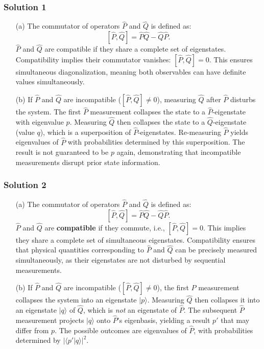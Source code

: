 \documentclass{article}
\begin{document}
\subsubsection{Solution 1}
\begin{enumerate}
    \item[(a)] The commutator of operators $\hat{P}$ and $\hat{Q}$ is defined as:
    \[
    [\hat{P}, \hat{Q}] = \hat{P}\hat{Q} - \hat{Q}\hat{P}.
    \]
    $\hat{P}$ and $\hat{Q}$ are compatible if they share a complete set of eigenstates. Compatibility implies their commutator vanishes: $[\hat{P}, \hat{Q}] = 0$. This ensures simultaneous diagonalization, meaning both observables can have definite values simultaneously.

    \item[(b)] If $\hat{P}$ and $\hat{Q}$ are incompatible ($[\hat{P}, \hat{Q}] \neq 0$), measuring $\hat{Q}$ after $\hat{P}$ disturbs the system. The first $\hat{P}$ measurement collapses the state to a $\hat{P}$-eigenstate with eigenvalue $p$. Measuring $\hat{Q}$ then collapses the state to a $\hat{Q}$-eigenstate (value $q$), which is a superposition of $\hat{P}$-eigenstates. Re-measuring $\hat{P}$ yields eigenvalues of $\hat{P}$ with probabilities determined by this superposition. The result is not guaranteed to be $p$ again, demonstrating that incompatible measurements disrupt prior state information.
\end{enumerate}

\subsubsection{Solution 2}
\begin{enumerate}
    \item[(a)] The commutator of operators $\hat{P}$ and $\hat{Q}$ is defined as:
    \[
    [\hat{P}, \hat{Q}] = \hat{P}\hat{Q} - \hat{Q}\hat{P}.
    \]
    $\hat{P}$ and $\hat{Q}$ are \textbf{compatible} if they commute, i.e., $[\hat{P}, \hat{Q}] = 0$. This implies they share a complete set of simultaneous eigenstates. Compatibility ensures that physical quantities corresponding to $\hat{P}$ and $\hat{Q}$ can be precisely measured simultaneously, as their eigenstates are not disturbed by sequential measurements.

    \item[(b)] If $\hat{P}$ and $\hat{Q}$ are incompatible ($[\hat{P}, \hat{Q}] \neq 0$), the first $\hat{P}$ measurement collapses the system into an eigenstate $|p\rangle$. Measuring $\hat{Q}$ then collapses it into an eigenstate $|q\rangle$ of $\hat{Q}$, which is \textit{not} an eigenstate of $\hat{P}$. The subsequent $\hat{P}$ measurement projects $|q\rangle$ onto $\hat{P}$'s eigenbasis, yielding a result $p'$ that may differ from $p$. The possible outcomes are eigenvalues of $\hat{P}$, with probabilities determined by $|\langle p'|q\rangle|^2$.
\end{enumerate}
\end{document}
